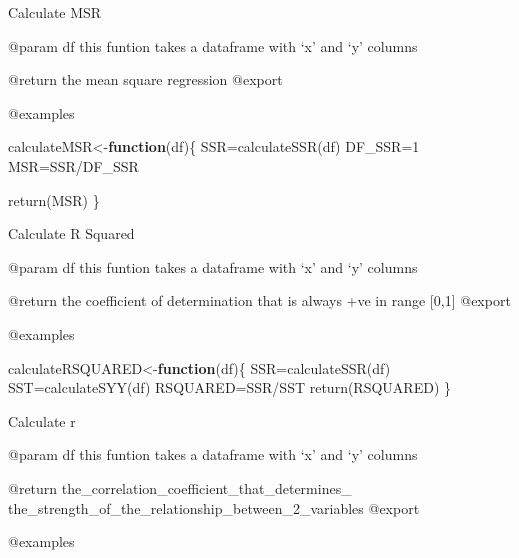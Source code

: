 \documentclass[
]{article}
\newenvironment{Shaded}{\begin{snugshade}}{\end{snugshade}}
\newcommand{\ControlFlowTok}[1]{\textcolor[rgb]{0.13,0.29,0.53}{\textbf{#1}}}
\newcommand{\DecValTok}[1]{\textcolor[rgb]{0.00,0.00,0.81}{#1}}
\newcommand{\FunctionTok}[1]{\textcolor[rgb]{0.00,0.00,0.00}{#1}}
\newcommand{\NormalTok}[1]{#1}
\newcommand{\OtherTok}[1]{\textcolor[rgb]{0.56,0.35,0.01}{#1}}
\newcommand{\SpecialCharTok}[1]{\textcolor[rgb]{0.00,0.00,0.00}{#1}}
\begin{document}
Calculate MSR

@param df this funtion takes a dataframe with `x' and `y' columns

@return the mean square regression @export

@examples

\begin{Shaded}
\begin{Highlighting}[]
\NormalTok{calculateMSR}\OtherTok{\textless{}{-}}\ControlFlowTok{function}\NormalTok{(df)\{}
\NormalTok{  SSR}\OtherTok{=}\FunctionTok{calculateSSR}\NormalTok{(df)}
\NormalTok{  DF\_SSR}\OtherTok{=}\DecValTok{1}
\NormalTok{  MSR}\OtherTok{=}\NormalTok{SSR}\SpecialCharTok{/}\NormalTok{DF\_SSR}
  
  \FunctionTok{return}\NormalTok{(MSR)}
\NormalTok{\}}
\end{Highlighting}
\end{Shaded}

Calculate R Squared

@param df this funtion takes a dataframe with `x' and `y' columns

@return the coefficient of determination that is always +ve in range
{[}0,1{]} @export

@examples

\begin{Shaded}
\begin{Highlighting}[]
\NormalTok{calculateRSQUARED}\OtherTok{\textless{}{-}}\ControlFlowTok{function}\NormalTok{(df)\{}
\NormalTok{  SSR}\OtherTok{=}\FunctionTok{calculateSSR}\NormalTok{(df)}
\NormalTok{  SST}\OtherTok{=}\FunctionTok{calculateSYY}\NormalTok{(df)}
\NormalTok{  RSQUARED}\OtherTok{=}\NormalTok{SSR}\SpecialCharTok{/}\NormalTok{SST}
  \FunctionTok{return}\NormalTok{(RSQUARED)}
\NormalTok{\}}
\end{Highlighting}
\end{Shaded}

Calculate r

@param df this funtion takes a dataframe with `x' and `y' columns

@return the\_correlation\_coefficient\_that\_determines\_
the\_strength\_of\_the\_relationship\_between\_2\_variables @export

@examples
\end{document}
